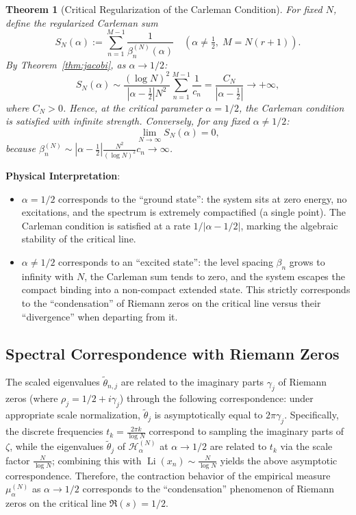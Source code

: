 \documentclass[12pt,a4paper]{amsart}
\theoremstyle{plain}
\newtheorem{theorem}{Theorem}[section]
\theoremstyle{definition}
\theoremstyle{remark}
\begin{document}
\begin{theorem}[Critical Regularization of the Carleman Condition]\label{thm:carleman}
For fixed $N$, define the regularized Carleman sum
\[
S_N(\alpha) := \sum_{n=1}^{M-1} \frac{1}{\beta_n^{(N)}(\alpha)} \quad (\alpha \neq \tfrac12,\; M=N(r+1)).
\]
By Theorem~\ref{thm:jacobi}, as $\alpha \to 1/2$:
\[
S_N(\alpha) \sim \frac{(\log N)^2}{|\alpha-\tfrac12|N^2}\sum_{n=1}^{M-1}\frac{1}{c_n} = \frac{C_N}{|\alpha-\tfrac12|} \to +\infty,
\]
where $C_N>0$. Hence, at the critical parameter $\alpha=1/2$, the Carleman condition is satisfied with infinite strength. Conversely, for any fixed $\alpha \neq 1/2$:
\[
\lim_{N\to\infty} S_N(\alpha) = 0,
\]
because $\beta_n^{(N)} \sim |\alpha-\tfrac12| \frac{N^2}{(\log N)^2} c_n \to \infty$.
\end{theorem}

\textbf{Physical Interpretation}:
\begin{itemize}
\item $\alpha=1/2$ corresponds to the ``ground state'': the system sits at zero energy, no excitations, and the spectrum is extremely compactified (a single point). The Carleman condition is satisfied at a rate $1/|\alpha-1/2|$, marking the algebraic stability of the critical line.
\item $\alpha \neq 1/2$ corresponds to an ``excited state'': the level spacing $\beta_n$ grows to infinity with $N$, the Carleman sum tends to zero, and the system escapes the compact binding into a non-compact extended state. This strictly corresponds to the ``condensation'' of Riemann zeros on the critical line versus their ``divergence'' when departing from it.
\end{itemize}

\subsection{Spectral Correspondence with Riemann Zeros}

The scaled eigenvalues $\tilde{\theta}_{n,j}$ are related to the imaginary parts $\gamma_j$ of Riemann zeros (where $\rho_j = 1/2 + i\gamma_j$) through the following correspondence: under appropriate scale normalization, $\tilde{\theta}_j$ is asymptotically equal to $2\pi\gamma_j$. Specifically, the discrete frequencies $t_k = \frac{2\pi k}{\log N}$ correspond to sampling the imaginary parts of $\zeta$, while the eigenvalues $\tilde{\theta}_j$ of $\mathcal{H}_\alpha^{(N)}$ at $\alpha \to 1/2$ are related to $t_k$ via the scale factor $\frac{N}{\log N}$; combining this with $\operatorname{Li}(x_n) \sim \frac{N}{\log N}$ yields the above asymptotic correspondence. Therefore, the contraction behavior of the empirical measure $\mu_\alpha^{(N)}$ as $\alpha \to 1/2$ corresponds to the ``condensation'' phenomenon of Riemann zeros on the critical line $\Re(s)=1/2$.
\end{document}
